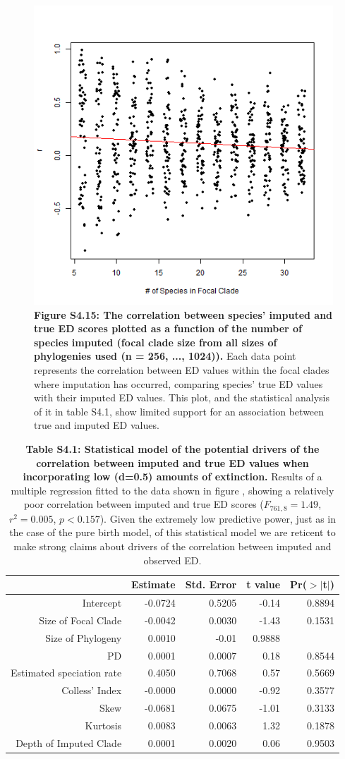 \documentclass[10pt,english]{article}
\begin{document}
\begin{figure}[!ht]
  \center
  \includegraphics[width=.5\textwidth]{../figures/edModelLowExtinction.png}
  \caption{\textbf{Figure S4.15: The correlation between species' imputed and
      true ED scores plotted as a function of the number of species imputed
      (focal clade size from all sizes of phylogenies used (n = 256, ...,
      1024)).} Each data point represents the correlation between ED values
      within the focal clades where imputation has occurred, comparing species'
      true ED values with their imputed ED values. This plot, and the
      statistical analysis of it in table S4.1, show limited support for an
      association between true and imputed ED values.}
\end{figure}

\begin{table}[ht]
  \centering
  \begin{tabular}{rrrrr}
    \hline
   & Estimate & Std. Error & t value & Pr($>$$|$t$|$) \\
    \hline
    Intercept & -0.0724 & 0.5205 & -0.14 & 0.8894 \\
    Size of Focal Clade & -0.0042 & 0.0030 & -1.43 & 0.1531 \\
    Size of Phylogeny & 0.0010 & -0.01 & 0.9888 \\
    PD & 0.0001 & 0.0007 & 0.18 & 0.8544 \\
    Estimated speciation rate & 0.4050 & 0.7068 & 0.57 & 0.5669 \\
    Colless' Index & -0.0000 & 0.0000 & -0.92 & 0.3577 \\
    Skew & -0.0681 & 0.0675 & -1.01 & 0.3133 \\
    Kurtosis & 0.0083 & 0.0063 & 1.32 & 0.1878 \\
    Depth of Imputed Clade & 0.0001 & 0.0020 & 0.06 & 0.9503 \\
     \hline
\end{tabular}
\caption{\textbf{Table S4.1: Statistical model of the potential drivers of the
    correlation between imputed and true ED values when incorporating low
    (d=0.5) amounts of extinction.} Results of a multiple regression fitted to
    the data shown in figure , showing a relatively poor correlation between
    imputed and true ED scores ($F_{761,8} = 1.49$, $r^{2} = 0.005$, $p <
    0.157$). Given the extremely low predictive power, just as in the case of
    the pure birth model, of this statistical model we are reticent to make
    strong claims about drivers of the correlation between imputed and observed
    ED.}
\end{table}
\end{document}
